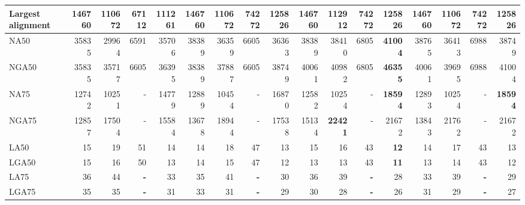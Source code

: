 \documentclass[12pt,a4paper]{article}
\begin{document}
\begin{table}[ht]
\begin{center}
\begin{tabular}{|l*{16}{|r}|}
Largest alignment & {\bf 146760} & 110672 & 67112 & 111261 & {\bf 146760} & 110672 & 74272 & 125826 & {\bf 146760} & 112912 & 74272 & 125826 & {\bf 146760} & 110672 & 74272 & 125826 \\ \hline
NA50 & 35835 & 29964 & 6591 & 35706 & 38389 & 36359 & 6605 & 36363 & 38389 & 38410 & 6805 & {\bf 41004} & 38765 & 36413 & 6988 & 38749 \\ \hline
NGA50 & 35835 & 35717 & 6605 & 36395 & 38389 & 37887 & 6605 & 38749 & 40061 & 40982 & 6805 & {\bf 46355} & 40061 & 39695 & 6988 & 41004 \\ \hline
NA75 & 12742 & 10251 & - & 14779 & 12889 & 10454 & - & 16870 & 12582 & 10254 & - & {\bf 18594} & 12893 & 10254 & - & {\bf 18594} \\ \hline
NGA75 & 12857 & 17504 & - & 15584 & 13678 & 18944 & - & 17538 & 15134 & {\bf 22421} & - & 21672 & 13843 & 21762 & - & 21672 \\ \hline
LA50 & 15 & 19 & 51 & 14 & 14 & 18 & 47 & 13 & 15 & 16 & 43 & {\bf 12} & 14 & 17 & 43 & 13 \\ \hline
LGA50 & 15 & 16 & 50 & 13 & 14 & 15 & 47 & 12 & 13 & 13 & 43 & {\bf 11} & 13 & 14 & 43 & 12 \\ \hline
LA75 & 36 & 44 & {\bf -} & 33 & 35 & 41 & {\bf -} & 30 & 36 & 39 & {\bf -} & 28 & 33 & 39 & {\bf -} & 29 \\ \hline
LGA75 & 35 & 35 & {\bf -} & 31 & 33 & 31 & {\bf -} & 29 & 30 & 28 & {\bf -} & 26 & 31 & 29 & {\bf -} & 27 \\ \hline
\end{tabular}
\end{center}
\end{table}
\end{document}
